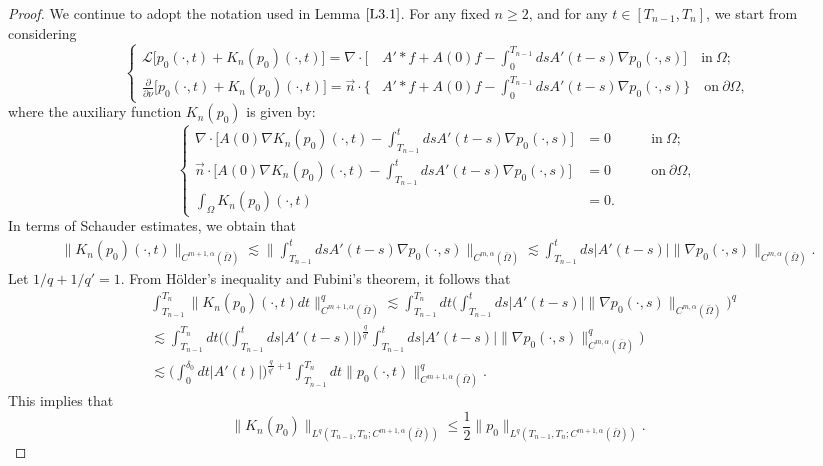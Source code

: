 \documentclass[13pt,CJK]{article}
\theoremstyle{plain}                       %
\theoremstyle{remark}
\numberwithin{equation}{section}
\begin{document}
\begin{proof}
We continue to adopt the notation used in Lemma $\ref{L3.1}$.
For any fixed $n\geq 2$,
and for any $t\in[T_{n-1},T_n]$,  we start from considering
\begin{equation}\label{pde:3.3}
\left\{
\begin{aligned}
  \mathcal{L}\Big[p_0(\cdot,t)+K_n(p_0)(\cdot,t)\Big]
  =\nabla\cdot\Big[&A'\ast f
  +A(0)f
  -\int_{0}^{T_{n-1}}dsA'(t-s)
  \nabla p_0(\cdot,s)
  \Big]\quad\text{in}~\Omega;\\
 \frac{\partial}{\partial\nu}
 \Big[p_0(\cdot,t)+K_n(p_0)(\cdot,t)\Big]
 = \vec{n}\cdot\bigg\{
 &A'\ast f+A(0)f
 -\int_{0}^{T_{n-1}}dsA'(t-s)
  \nabla p_0(\cdot,s)
  \bigg\}\quad\text{on}~\partial\Omega,
\end{aligned}\right.
\end{equation}
where the auxiliary function $K_n(p_0)$ is given by:
\begin{equation*}
\left\{\begin{aligned}
\nabla\cdot\Big[A(0)\nabla K_n(p_0)(\cdot,t)-\int_{T_{n-1}}^{t}ds
A'(t-s)\nabla p_0(\cdot,s)
\Big]&=0 &\quad &\text{in}~\Omega;\\
\vec{n}\cdot\Big[A(0)\nabla K_n(p_0)(\cdot,t)-\int_{T_{n-1}}^{t}ds
A'(t-s)\nabla p_0(\cdot,s)
\Big]&=0 &\quad &\text{on}~\partial\Omega,\\
\int_{\Omega}K_n(p_0)(\cdot,t)&=0.
\end{aligned}\right.
\end{equation*}
In terms of Schauder estimates, we obtain that
\begin{equation*}
\begin{aligned}
\|K_n(p_0)(\cdot,t)\|_{C^{m+1,\alpha}(\bar\Omega)}
\lesssim
\bigg\|\int_{T_{n-1}}^{t}ds
A'(t-s)\nabla p_0(\cdot,s)\bigg\|_{C^{m,\alpha}(\bar\Omega)}
\lesssim
\int_{T_{n-1}}^{t}ds
|A'(t-s)|\|\nabla p_0(\cdot,s)\|_{C^{m,\alpha}(\bar\Omega)}.
\end{aligned}
\end{equation*}
Let $1/q+1/{q'} = 1$. From H\"older's inequality and Fubini's theorem,
it follows that
\begin{equation*}
\begin{aligned}
&\int_{T_{n-1}}^{T_n}\|K_n(p_0)(\cdot,t)
dt\|^q_{C^{m+1,\alpha}(\bar\Omega)}
\lesssim
\int_{T_{n-1}}^{T_n}dt\Big(\int_{T_{n-1}}^{t}ds
|A'(t-s)|\|\nabla p_0(\cdot,s)\|_{C^{m,\alpha}(\bar\Omega)}\Big)^q\\
&\lesssim\int_{T_{n-1}}^{T_n}dt
\bigg(\Big(\int_{T_{n-1}}^{t}ds|A'(t-s)|\Big)^{\frac{q}{q'}}
\int_{T_{n-1}}^{t}ds
|A'(t-s)|\|\nabla p_0(\cdot,s)\|^q_{C^{m,\alpha}(\bar\Omega)}\bigg)\\
&\lesssim \bigg(\int_{0}^{\delta_0}dt|A'(t)|\bigg)^{\frac{q}{q'}+1}
\int_{T_{n-1}}^{T_n}dt\|p_0(\cdot,t)
\|^q_{C^{m+1,\alpha}(\bar\Omega)}.
\end{aligned}
\end{equation*}
This implies that
\begin{equation}\label{f:3.7}
 \|K_n(p_0)
\|_{L^q(T_{n-1},T_n; C^{m+1,\alpha}(\bar\Omega))}
\leq \frac{1}{2} \|p_0
\|_{L^q(T_{n-1},T_n; C^{m+1,\alpha}(\bar\Omega))}.
\end{equation}


\end{proof}
\end{document}
